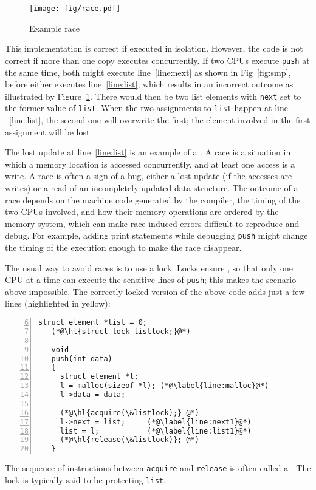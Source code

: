 \begin{figure}[t]
\center
\texttt{[image: fig/race.pdf]}
\caption{Example race}
\label{fig:race}
\end{figure}
This implementation is correct if executed in isolation.
However, the code is not correct if more than one
copy executes concurrently.
If two CPUs execute
\lstinline{push}
at the same time,
both might execute line~\ref{line:next} as shown in Fig~\ref{fig:smp},
before either executes line~\ref{line:list},  which results
in an incorrect outcome as illustrated by Figure~\ref{fig:race}.
There would then be two
list elements with
\lstinline{next}
set to the former value of
\lstinline{list}.
When the two assignments to
\lstinline{list}
happen at line ~\ref{line:list},
the second one will overwrite the first;
the element involved in the first assignment
will be lost.

The lost update at line~\ref{line:list} is an example of a
.
A race is a situation in which a memory location is accessed
concurrently, and at least one access is a write.
A race is often a sign of a bug, either a lost update
(if the accesses are writes) or a read of
an incompletely-updated data structure.
The outcome of a race depends on
the machine code generated by the compiler,
the timing of the two CPUs involved,
and how their memory operations are ordered by the memory system,
which can make race-induced errors difficult to reproduce
and debug.
For example, adding print statements while debugging
\lstinline{push}
might change the timing of the execution enough
to make the race disappear.

The usual way to avoid races is to use a lock.
Locks ensure
,
so that only one CPU at a time can execute 
the sensitive lines of
\lstinline{push};
this makes the scenario above impossible.
The correctly locked version of the above code
adds just a few lines (highlighted in yellow):
\begin{lstlisting}[numbers=left,firstnumber=6]
   struct element *list = 0;
   (*@\hl{struct lock listlock;}@*)
    	
   void
   push(int data)
   {
     struct element *l;
     l = malloc(sizeof *l); (*@\label{line:malloc}@*)
     l->data = data;
   
     (*@\hl{acquire(\&listlock);} @*)
     l->next = list;     (*@\label{line:next1}@*)
     list = l;           (*@\label{line:list1}@*)
     (*@\hl{release(\&listlock)}; @*)
   }
\end{lstlisting}
The sequence of instructions between
\lstinline{acquire}
and
\lstinline{release}
is often called a
.
The lock is typically said to be protecting
\lstinline{list}.

